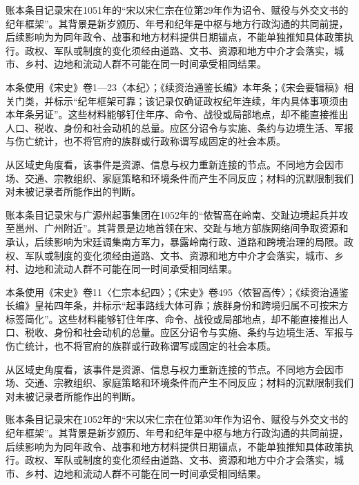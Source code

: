账本条目记录宋在1051年的“宋以宋仁宗在位第29年作为诏令、赋役与外交文书的纪年框架”。其背景是新岁颁历、年号和纪年是中枢与地方行政沟通的共同前提，后续影响为为同年政令、战事和地方材料提供日期锚点，不能单独推知具体政策执行。政权、军队或制度的变化须经由道路、文书、资源和地方中介才会落实，城市、乡村、边地和流动人群不可能在同一时间承受相同结果。

本条使用《宋史》卷1—23〈本纪〉；《续资治通鉴长编》本年条；《宋会要辑稿》相关门类，并标示“纪年框架可靠；该记录仅确证政权纪年连续，年内具体事项须由本年条另证”。这些材料能够钉住年序、命令、战役或局部地点，却不能直接推出人口、税收、身份和社会动机的总量。应区分诏令与实施、条约与边境生活、军报与伤亡统计，也不将官府的族群或行政称谓写成固定的社会本质。

从区域史角度看，该事件是资源、信息与权力重新连接的节点。不同地方会因市场、交通、宗教组织、家庭策略和环境条件而产生不同反应；材料的沉默限制我们对未被记录者所能作出的判断。

账本条目记录宋与广源州起事集团在1052年的“侬智高在岭南、交趾边境起兵并攻至邕州、广州附近”。其背景是边地首领在宋、交趾与地方部族网络间争取资源和承认，后续影响为宋廷调集南方军力，暴露岭南行政、道路和跨境治理的局限。政权、军队或制度的变化须经由道路、文书、资源和地方中介才会落实，城市、乡村、边地和流动人群不可能在同一时间承受相同结果。

本条使用《宋史》卷11〈仁宗本纪四〉；《宋史》卷495〈侬智高传〉；《续资治通鉴长编》皇祐四年条，并标示“起事路线大体可靠；族群身份和跨境归属不可按宋方标签简化”。这些材料能够钉住年序、命令、战役或局部地点，却不能直接推出人口、税收、身份和社会动机的总量。应区分诏令与实施、条约与边境生活、军报与伤亡统计，也不将官府的族群或行政称谓写成固定的社会本质。

从区域史角度看，该事件是资源、信息与权力重新连接的节点。不同地方会因市场、交通、宗教组织、家庭策略和环境条件而产生不同反应；材料的沉默限制我们对未被记录者所能作出的判断。

账本条目记录宋在1052年的“宋以宋仁宗在位第30年作为诏令、赋役与外交文书的纪年框架”。其背景是新岁颁历、年号和纪年是中枢与地方行政沟通的共同前提，后续影响为为同年政令、战事和地方材料提供日期锚点，不能单独推知具体政策执行。政权、军队或制度的变化须经由道路、文书、资源和地方中介才会落实，城市、乡村、边地和流动人群不可能在同一时间承受相同结果。

